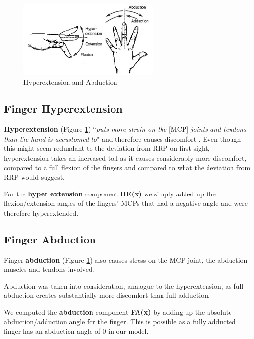 \documentclass{sig-alternate-05-2015}
\begin{document}
\begin{figure}[b]
\centering
\vspace{-10pt}
\includegraphics[width=7cm]{abduction}
\vspace{-10pt}
\caption{Hyperextension and Abduction}
\label{fig:hyperabduction}
\vspace{-10pt}
\end{figure}

\subsection{Finger Hyperextension}

\textbf{Hyperextension} (Figure \ref{fig:hyperabduction}) ``\textit{puts more strain on the }[MCP] \textit{joints and tendons than the hand is accustomed to}" and therefore causes discomfort \cite{laviola1999survey}.
Even though this might seem redundant to the deviation from RRP on first sight, hyperextension takes an increased toll as it causes considerably more discomfort, compared to a full flexion of the fingers and compared to what the deviation from RRP would suggest.

For the \textbf{hyper extension} component \textbf{HE(x)} we simply added up the flexion/extension angles of the fingers' MCPs that had a negative angle and were therefore hyperextended.

\subsection{Finger Abduction}

Finger \textbf{abduction} (Figure \ref{fig:hyperabduction})
also causes stress on the MCP joint, the abduction muscles and tendons involved.

Abduction was taken into consideration, analogue to the hyperextension, as full abduction creates substantially more discomfort than full adduction.

We computed the \textbf{abduction} component \textbf{FA(x)} by adding up the absolute abduction/adduction angle for the finger. This is possible as a fully adducted finger has an abduction angle of 0 in our model.
\end{document}
